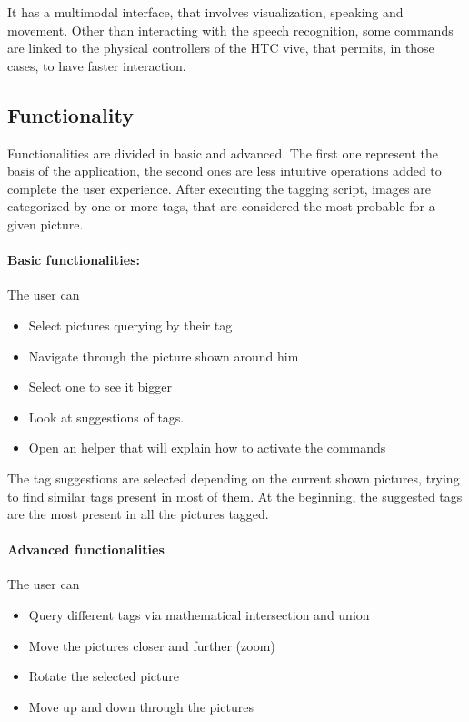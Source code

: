 \documentclass[11pt,a4paper]{article}
\begin{document}
It has a multimodal interface, that involves visualization, speaking and movement.
Other than interacting with the speech recognition, some commands are linked to the physical controllers of the HTC vive, that permits, in those cases, to have faster interaction.

\subsection{Functionality}
Functionalities are divided in basic and advanced.
The first one represent the basis of the application, the second ones are less intuitive operations added to complete the user experience.
After executing the tagging script, images are categorized by one or more tags, that are considered the most probable for a given picture.

\paragraph{Basic functionalities:}
The user can
\begin{itemize}
\item Select pictures querying by their tag
\item Navigate through the picture shown around him
\item Select one to see it bigger 
\item Look at suggestions of tags.
\item Open an helper that will explain how to activate the commands
\end{itemize} 
The tag suggestions are selected depending on the current shown pictures, trying to find similar tags present in most of them.
At the beginning, the suggested tags are the most present in all the pictures tagged.


\paragraph{Advanced functionalities}
The user can
\begin{itemize}
\item Query different tags via mathematical intersection and union
\item Move the pictures closer and further (zoom)
\item Rotate the selected picture
\item Move up and down through the pictures
\end{itemize}
\end{document}
